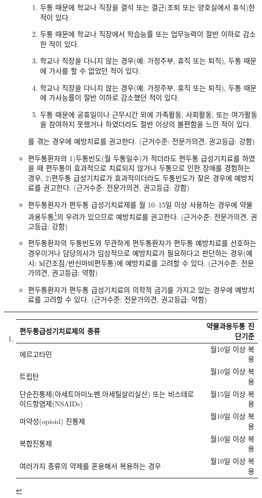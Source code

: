 \documentclass[]{book}
\providecommand{\tightlist}{%
  \setlength{\itemsep}{0pt}\setlength{\parskip}{0pt}}
\let\rmarkdownfootnote\footnote%
\def\footnote{\protect\rmarkdownfootnote}
\begin{document}
\begin{itemize}
\begin{itemize}
{      \begin{enumerate}
      \def\labelenumi{\arabic{enumi}.}
      \tightlist
      \item
        두통 때문에 학교나 직장을 결석 또는 결근(조퇴 또는 양호실에서 휴식)한 적이 있다.
      \item
        두통 때문에 학교나 직장에서 학습능률 또는 업무능력이 절반 이하로 감소한 적이 있다.
      \item
        학교나 직장을 다니지 않는 경우(예: 가정주부, 휴직 또는 퇴직), 두통 때문에 가사를 할 수 없었던 적이 있다.
      \item
        학교나 직장을 다니지 않는 경우(예: 가정주부, 휴직 또는 퇴직), 두통 때문에 가사능률이 절반 이하로 감소했던 적이 있다.
      \item
        두통 때문에 공휴일이나 근무시간 외에 가족활동, 사회활동, 또는 여가활동을 참여하지 못했거나 하였더라도 절반 이상의 불편함을 느낀 적이 있다.
      \end{enumerate}}를 겪는 경우에 예방치료를 권고한다. (근거수준: 전문가의견, 권고등급: 강함)
  \item
    편두통환자의 1)두통빈도(월 두통일수)가 적더라도 편두통 급성기치료를 하였을 때 편두통이 효과적으로 치료되지 않거나 두통으로 인한 장애를 경험하는 경우, 2)편두통 급성기치료가 효과적이더라도 두통빈도가 잦은 경우에 예방치료를 권고한다. (근거수준: 전문가의견, 권고등급: 강함)
  \item
    편두통환자가 편두통 급성기치료제를 월 10--15일 이상 사용하는 경우에 약물과용두통\footnote{\begin{longtable}[]{@{}lr@{}}
      \toprule
      편두통급성기치료제의 종류 & 약물과용두통 진단기준\tabularnewline
      \midrule
      \endhead
      에르고타민 & 월10일 이상 복용\tabularnewline
      트립탄 & 월10일 이상 복용\tabularnewline
      단순진통제(아세트아미노펜,아세틸살리실산) 또는 비스테로이드항염제(NSAIDs) & 월15일 이상 복용\tabularnewline
      마약성(opioid) 진통제 & 월10일 이상 복용\tabularnewline
      복합진통제 & 월10일 이상 복용\tabularnewline
      여러가지 종류의 약제를 혼용해서 복용하는 경우 & 월10일 이상 복용\tabularnewline
      \bottomrule
      \end{longtable}}의 우려가 있으므로 예방치료를 권고한다. (근거수준: 전문가의견, 권고등급: 강함)
  \item
    편두통환자의 두통빈도와 무관하게 편두통환자가 편두통 예방치료를 선호하는 경우이거나 담당의사가 임상적으로 예방치료가 필요하다고 판단하는 경우(예시: 뇌간조짐/반신마비편두통)에 예방치료를 고려할 수 있다. (근거수준: 전문가의견, 권고등급: 약함)
  \item
    편두통환자가 편두통 급성기치료의 의학적 금기를 가지고 있는 경우에 예방치료를 고려할 수 있다. (근거수준: 전문가의견, 권고등급: 약함)
  \end{itemize}
\end{itemize}
\end{document}
